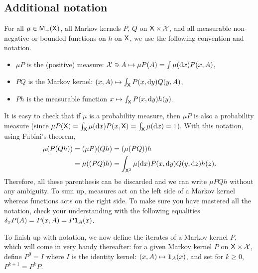 \documentclass[english,graybox,envcountchap,envcountsame,sectrefs,shortlabels]{svmono}
\theoremstyle{style}
\begin{document}
\subsection{Additional notation}
For all $\mu\in\mathsf{M}_{+}(\mathsf{X})$, all Markov kernels $P$, $Q$ on
$\mathsf{X}\times\mathcal{X}$, and all measurable non-negative or bounded
functions on $h$ on $\mathsf{X}$, we use the following convention and
notation.
\begin{itemize}
\item $\mu P$ is the (positive) measure: $\mathcal{X}\ni A\mapsto\mu P(A)=\int\mu(\mathrm{d} x)P(x,A)$,
\item $PQ$ is the Markov kernel: $(x,A)\mapsto\int_{\mathsf{X}}P(x,\mathrm{d} y)Q(y,A)$,
\item $Ph$ is the measurable function $x\mapsto\int_{\mathsf{X}}P(x,\mathrm{d} y)h(y)$.
\end{itemize}
It is easy to check that if $\mu$ is a probability measure, then
$\mu P$ is also a probability measure (since $\mu P(\mathsf{X})=\int_{\mathsf{X}}\mu(\mathrm{d} x)P(x,\mathsf{X})=\int_{\mathsf{X}}\mu(\mathrm{d} x)=1$).
With this notation, using Fubini's theorem,
\begin{align*}
\mu(P(Qh)) & =(\mu P)(Qh)=(\mu(PQ))h\\
 & =\mu((PQ)h)=\int_{\mathsf{X}^{3}}\mu(\mathrm{d} x)P(x,\mathrm{d} y)Q(y,\mathrm{d} z)h(z).
\end{align*}
Therefore, all these parenthesis can be discarded and we can write
$\mu PQh$ without any ambiguity. 
To sum up, measures act on the left side of a Markov kernel whereas
functions acts on the right side. To make sure you have mastered all
the notation, check your understanding with the following equalities
$\delta_{x}P(A)=P(x,A)=P\mathbf{1}_{A}(x)$.

To finish up with notation, we now define the iterates of a Markov
kernel $P$, which will come in very handy thereafter: for a given
Markov kernel $P$ on $\mathsf{X}\times\mathcal{X}$, define $P^{0}=I$ where
$I$ is the identity kernel: $(x,A)\mapsto\mathbf{1}_{A}(x)$, and set for
$k\geq0$, $P^{k+1}=P^{k}P$.
\end{document}
